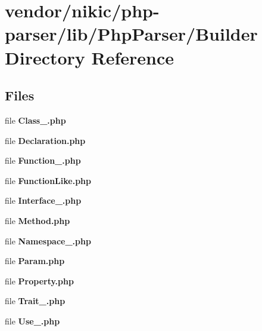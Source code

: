 \section{vendor/nikic/php-\/parser/lib/\+Php\+Parser/\+Builder Directory Reference}
\label{dir_673051bfc2f1ea9f61b9d1e09f209c59}
\subsection*{Files}
\begin{DoxyCompactItemize}
\item 
file {\bf Class\+\_\+.\+php}
\item 
file {\bf Declaration.\+php}
\item 
file {\bf Function\+\_\+.\+php}
\item 
file {\bf Function\+Like.\+php}
\item 
file {\bf Interface\+\_\+.\+php}
\item 
file {\bf Method.\+php}
\item 
file {\bf Namespace\+\_\+.\+php}
\item 
file {\bf Param.\+php}
\item 
file {\bf Property.\+php}
\item 
file {\bf Trait\+\_\+.\+php}
\item 
file {\bf Use\+\_\+.\+php}
\end{DoxyCompactItemize}
